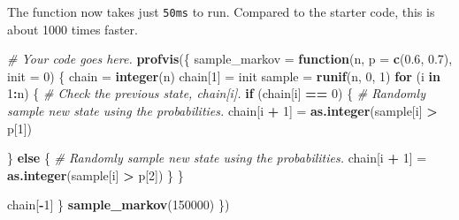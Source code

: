 \documentclass[
]{article}
\newenvironment{Shaded}{\begin{snugshade}}{\end{snugshade}}
\newcommand{\CommentTok}[1]{\textcolor[rgb]{0.56,0.35,0.01}{\textit{#1}}}
\newcommand{\ControlFlowTok}[1]{\textcolor[rgb]{0.13,0.29,0.53}{\textbf{#1}}}
\newcommand{\DataTypeTok}[1]{\textcolor[rgb]{0.13,0.29,0.53}{#1}}
\newcommand{\DecValTok}[1]{\textcolor[rgb]{0.00,0.00,0.81}{#1}}
\newcommand{\FloatTok}[1]{\textcolor[rgb]{0.00,0.00,0.81}{#1}}
\newcommand{\KeywordTok}[1]{\textcolor[rgb]{0.13,0.29,0.53}{\textbf{#1}}}
\newcommand{\NormalTok}[1]{#1}
\newcommand{\OperatorTok}[1]{\textcolor[rgb]{0.81,0.36,0.00}{\textbf{#1}}}
\newcommand{\StringTok}[1]{\textcolor[rgb]{0.31,0.60,0.02}{#1}}
\begin{document}
The function now takes just \texttt{50ms} to run. Compared to the
starter code, this is about 1000 times faster.

\begin{Shaded}
\begin{Highlighting}[]
\CommentTok{\# Your code goes here.}
\KeywordTok{profvis}\NormalTok{(\{}
\NormalTok{  sample\_markov =}\StringTok{ }\ControlFlowTok{function}\NormalTok{(n, }\DataTypeTok{p =} \KeywordTok{c}\NormalTok{(}\FloatTok{0.6}\NormalTok{, }\FloatTok{0.7}\NormalTok{), }\DataTypeTok{init =} \DecValTok{0}\NormalTok{) \{}
\NormalTok{  chain =}\StringTok{ }\KeywordTok{integer}\NormalTok{(n)}
\NormalTok{  chain[}\DecValTok{1}\NormalTok{] =}\StringTok{ }\NormalTok{init}
\NormalTok{  sample =}\StringTok{ }\KeywordTok{runif}\NormalTok{(n, }\DecValTok{0}\NormalTok{, }\DecValTok{1}\NormalTok{)}
  \ControlFlowTok{for}\NormalTok{ (i }\ControlFlowTok{in} \DecValTok{1}\OperatorTok{:}\NormalTok{n) \{}
    \CommentTok{\# Check the previous state, chain[i].}
    \ControlFlowTok{if}\NormalTok{ (chain[i] }\OperatorTok{==}\StringTok{ }\DecValTok{0}\NormalTok{) \{}
      \CommentTok{\# Randomly sample new state using the probabilities.}
\NormalTok{      chain[i }\OperatorTok{+}\StringTok{ }\DecValTok{1}\NormalTok{] =}\StringTok{ }\KeywordTok{as.integer}\NormalTok{(sample[i] }\OperatorTok{\textgreater{}}\StringTok{ }\NormalTok{p[}\DecValTok{1}\NormalTok{])}

\NormalTok{    \} }\ControlFlowTok{else}\NormalTok{ \{}
      \CommentTok{\# Randomly sample new state using the probabilities.}
\NormalTok{      chain[i }\OperatorTok{+}\StringTok{ }\DecValTok{1}\NormalTok{] =}\StringTok{ }\KeywordTok{as.integer}\NormalTok{(sample[i] }\OperatorTok{\textgreater{}}\StringTok{ }\NormalTok{p[}\DecValTok{2}\NormalTok{])}
\NormalTok{    \}}
\NormalTok{  \}}

\NormalTok{  chain[}\OperatorTok{{-}}\DecValTok{1}\NormalTok{]}
\NormalTok{\}}
  \KeywordTok{sample\_markov}\NormalTok{(}\DecValTok{150000}\NormalTok{)}
\NormalTok{\})}
\end{Highlighting}
\end{Shaded}
\end{document}
